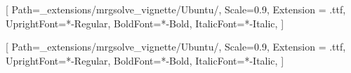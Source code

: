   
\makeatletter
\renewcommand{\maketitle}{\bgroup\setlength{\parindent}{0pt}
\begin{flushleft}
  {\sffamily\huge\textbf{{\@title}}} 
  \vspace{0.3cm} \newline
  {\Large {\@subtitle}} \vspace{0.3cm} \newline
  \@author 
  \vspace{0.1cm}
  \newline
  \@date
  \vspace{0.5cm}
\end{flushleft}\egroup
}
\makeatother

\setsansfont{Ubuntu}[
    Path=_extensions/mrgsolve_vignette/Ubuntu/,
    Scale=0.9,
    Extension = .ttf,
    UprightFont=*-Regular,
    BoldFont=*-Bold,
    ItalicFont=*-Italic,
    ]

\setmainfont{Ubuntu}[
    Path=_extensions/mrgsolve_vignette/Ubuntu/,
    Scale=0.9,
    Extension = .ttf,
    UprightFont=*-Regular,
    BoldFont=*-Bold,
    ItalicFont=*-Italic,
    ]